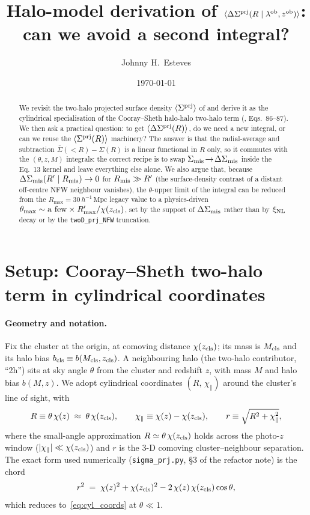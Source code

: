 \documentclass[a4paper, 11pt]{article}
\title{\textcolor{harvardcrimson}{\textbf{Halo-model derivation of \(\avg{\DSprj(R\mid\lob,\zob)}\):\\
can we avoid a second integral?}}}
\author{Johnny H.\ Esteves}
\date{\today}
\newcommand{\zcls}{z_{\rm cls}}
\newcommand{\Mcls}{M_{\rm cls}}
\newcommand{\xinl}{\xi_{\rm NL}}
\newcommand{\hMpc}{h^{-1}\,\mathrm{Mpc}}
\newcommand{\bcls}{b_{\rm cls}}
\newcommand{\Sprj}{\Sigma^{\rm prj}}
\newcommand{\Smis}{\Sigma_{\rm mis}}
\newcommand{\DSmis}{\Delta\Sigma_{\rm mis}}
\newcommand{\DSprj}{\Delta\Sigma^{\rm prj}}
\newcommand{\avg}[1]{\langle #1 \rangle}
\newcommand{\Rmis}{R_{\rm mis}}
\newcommand{\chipar}{\chi_\parallel}
\begin{document}
\maketitle
\thispagestyle{fancy}

\begin{abstract}
\noindent
We revisit the two-halo projected surface density
\(\avg{\Sprj}\) of \citet{Costanzi2026} and derive it as the
cylindrical specialisation of the Cooray--Sheth halo-halo two-halo
term (\citet{CoorayShethHaloModel}, Eqs.~86--87). We then ask a
practical question: to get \(\avg{\DSprj(R)}\), do we need a new
integral, or can we reuse the \(\avg{\Sprj(R)}\) machinery? The
answer is that the radial-average and subtraction
\(\bar\Sigma(<R)-\Sigma(R)\) is a linear functional in \(R\) only,
so it commutes with the \((\theta, z, M)\) integrals: the correct
recipe is to swap \(\Smis\!\to\!\DSmis\) inside the Eq.~13 kernel
and leave everything else alone. We also argue that, because
\(\DSmis(R'\mid\Rmis)\to 0\) for \(\Rmis\gg R'\) (the
surface-density contrast of a distant off-centre NFW neighbour
vanishes), the \(\theta\)-upper limit of the integral can be
reduced from the \(R_{\max}\!=\!30\,\hMpc\) legacy value to a
physics-driven \(\theta_{\max}\sim\text{a few}\times R'_{\max}/\chi(\zcls)\),
set by the support of \(\DSmis\) rather than by \(\xinl\) decay
or by the \texttt{twoD\_prj\_NFW} truncation.
\end{abstract}

\section{Setup: Cooray--Sheth two-halo term in cylindrical coordinates}
\label{sec:setup}

\paragraph{Geometry and notation.}
Fix the cluster at the origin, at comoving distance
\(\chi(\zcls)\); its mass is \(\Mcls\) and its halo bias
\(\bcls\equiv b(\Mcls,\zcls)\). A neighbouring halo (the
two-halo contributor, ``2h'') sits at sky angle \(\theta\) from
the cluster and redshift \(z\), with mass \(M\) and halo bias
\(b(M,z)\). We adopt cylindrical coordinates
\((R,\,\chipar)\) around the cluster's line of sight, with
\begin{equation}
R \equiv \theta\,\chi(z) \;\approx\; \theta\,\chi(\zcls) ,
\qquad
\chipar \equiv \chi(z) - \chi(\zcls) ,
\qquad
r \equiv \sqrt{R^2+\chipar^2} ,
\label{eq:cyl_coords}
\end{equation}
where the small-angle approximation \(R\simeq\theta\,\chi(\zcls)\)
holds across the photo-\(z\) window (\(|\chipar|\ll\chi(\zcls)\))
and \(r\) is the 3-D comoving cluster--neighbour separation. The
exact form used numerically
(\texttt{sigma\_prj.py}, \S3 of the refactor note) is the chord
\begin{equation}
r^2 \;=\; \chi(z)^2 + \chi(\zcls)^2 - 2\,\chi(z)\,\chi(\zcls)\cos\theta ,
\label{eq:r_exact}
\end{equation}
which reduces to~\eqref{eq:cyl_coords} at \(\theta\ll 1\).
\end{document}

